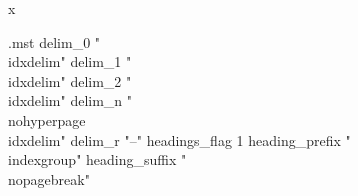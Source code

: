 x\begin{filecontents*}{\jobname.mst}
delim_0 "\\idxdelim"
delim_1 "\\idxdelim"
delim_2 "\\idxdelim"
delim_n "\\nohyperpage{\\idxdelim}"
delim_r "--"
headings_flag 1
heading_prefix "\\indexgroup{{"
heading_suffix "}}\\nopagebreak\n"
\end{filecontents*}
\documentclass[cfonts]{nostarch}






\frontmatter


%

\mainmatter

\part{From Python to Pandas}
















\part{Exploratory Data Analysis}








\part{Statistical Inference}



